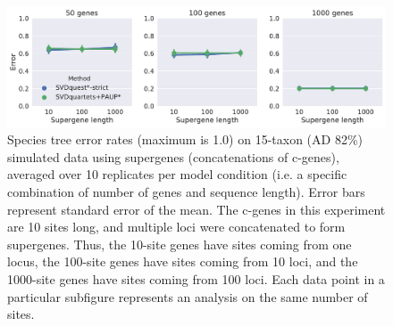 \begin{figure}
  \centering
  \includegraphics[width=\textwidth]{svdquest-figs/binned_rfdists_paup_15tax.pdf}
  \caption[Species tree error rates for SVDquest*-strict and SVDquartets+PAUP* on 15-taxon supergene datasets]{Species tree error rates (maximum is 1.0) on 15-taxon (AD 82\%) simulated data using 
    supergenes (concatenations of c-genes), averaged over 10
    replicates per model condition (i.e. a specific combination of number of genes and sequence length). Error bars represent standard error of the mean. The c-genes in this experiment are 10 sites long, and multiple loci were
    concatenated to form supergenes. Thus, the 
    10-site genes have sites coming from one locus, the 100-site genes have
    sites coming from 10 loci, and the 1000-site genes have sites coming
    from 100 loci. Each data point in a particular subfigure represents
    an analysis on the same number of sites.
  } %
  \label{fig:s10}
\end{figure}



